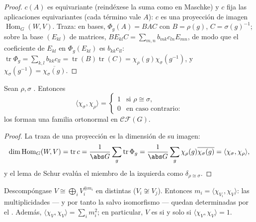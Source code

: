 \begin{proof}
$c(A)$ es equivariante (reindéxese la suma como en Maschke) y $c$ fija
las aplicaciones equivariantes (cada término vale $A$): $c$ es una
proyección de imagen $\operatorname{Hom}_G(W, V)$. Traza: en bases,
$\Phi_g(A) = BAC$ con $B = \rho(g)$, $C = \sigma(g)^{-1}$; sobre la base
$(E_{kl})$ de matrices, $BE_{kl}C = \sum_{m,n}
b_{mk}c_{ln}E_{mn}$, de modo que el coeficiente de $E_{kl}$ en
$\Phi_g(E_{kl})$ es $b_{kk}c_{ll}$: $\operatorname{tr}\Phi_g =
\sum_{k,l}b_{kk}c_{ll} = \operatorname{tr}(B)
\operatorname{tr}(C) = \chi_\rho(g)\chi_\sigma(g^{-1})$, y
$\chi_\sigma(g^{-1}) = \overline{\chi_\sigma(g)}$.
\end{proof}

\begin{theorem}
\label{thm:b3:representations:orthogonality}
Sean $\rho, \sigma$
\emph{}.
Entonces
\[
\langle\chi_\sigma, \chi_\rho\rangle =
\begin{cases}
1 & \text{si } \rho \cong \sigma,\\
0 & \text{en caso contrario:}
\end{cases}
\]
los 
 forman una familia
ortonormal en
$\mathcal{CF}(G)$.
\end{theorem}

\begin{proof}
La traza de una proyección es la dimensión de su imagen:
\[
\dim\operatorname{Hom}_G(W, V) = \operatorname{tr} c
= \frac1{\abs G}\sum_g \operatorname{tr}\Phi_g
= \frac1{\abs G}\sum_g \chi_\rho(g)\overline{\chi_\sigma(g)}
= \langle \chi_\sigma, \chi_\rho\rangle,
\]
y el lema de Schur evalúa el miembro de la izquierda como
$\delta_{\rho \cong
\sigma}$.
\end{proof}

\begin{corollary}\label{cor:b3:representations:multiplicity}
Descompóngase $V \cong \bigoplus_i V_i^{\oplus m_i}$ en
 distintas
($V_i \not\cong V_j$). Entonces $m_i = \langle
\chi_{V_i}, \chi_V\rangle$: las multiplicidades --- y por tanto la
 salvo isomorfismo
--- quedan determinadas por el
. Además,
$\langle \chi_V, \chi_V\rangle = \sum_i
m_i^2$; en particular, $V$ es
 si y solo si
$\langle\chi_V,
\chi_V\rangle = 1$.
\end{corollary}

